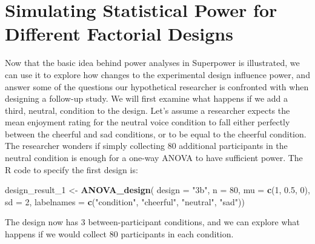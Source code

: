 \documentclass[
  ,jou,floatsintext]{apa6}
\newenvironment{Shaded}{\begin{snugshade}}{\end{snugshade}}
\newcommand{\DataTypeTok}[1]{\textcolor[rgb]{0.13,0.29,0.53}{#1}}
\newcommand{\DecValTok}[1]{\textcolor[rgb]{0.00,0.00,0.81}{#1}}
\newcommand{\FloatTok}[1]{\textcolor[rgb]{0.00,0.00,0.81}{#1}}
\newcommand{\KeywordTok}[1]{\textcolor[rgb]{0.13,0.29,0.53}{\textbf{#1}}}
\newcommand{\NormalTok}[1]{#1}
\newcommand{\StringTok}[1]{\textcolor[rgb]{0.31,0.60,0.02}{#1}}
\begin{document}
\hypertarget{simulating-statistical-power-for-different-factorial-designs}{%
\section{Simulating Statistical Power for Different Factorial Designs}\label{simulating-statistical-power-for-different-factorial-designs}}

Now that the basic idea behind power analyses in Superpower is illustrated, we can use it to explore how changes to the experimental design influence power, and answer some of the questions our hypothetical researcher is confronted with when designing a follow-up study.
We will first examine what happens if we add a third, neutral, condition to the design.
Let's assume a researcher expects the mean enjoyment rating for the neutral voice condition to fall either perfectly between the cheerful and sad conditions, or to be equal to the cheerful condition.
The researcher wonders if simply collecting 80 additional participants in the neutral condition is enough for a one-way ANOVA to have sufficient power.
The R code to specify the first design is:

\begin{Shaded}
\begin{Highlighting}[]
\NormalTok{design_result_}\DecValTok{1}\NormalTok{ <-}\StringTok{ }\KeywordTok{ANOVA_design}\NormalTok{(}
  \DataTypeTok{design =} \StringTok{"3b"}\NormalTok{, }\DataTypeTok{n =} \DecValTok{80}\NormalTok{, }
  \DataTypeTok{mu =} \KeywordTok{c}\NormalTok{(}\DecValTok{1}\NormalTok{, }\FloatTok{0.5}\NormalTok{, }\DecValTok{0}\NormalTok{), }\DataTypeTok{sd =} \DecValTok{2}\NormalTok{, }
  \DataTypeTok{labelnames =} \KeywordTok{c}\NormalTok{(}\StringTok{"condition"}\NormalTok{, }
                 \StringTok{"cheerful"}\NormalTok{, }
                 \StringTok{"neutral"}\NormalTok{, }\StringTok{"sad"}\NormalTok{))}
\end{Highlighting}
\end{Shaded}

The design now has 3 between-participant conditions, and we can explore what happens if we would collect 80 participants in each condition.
\end{document}
